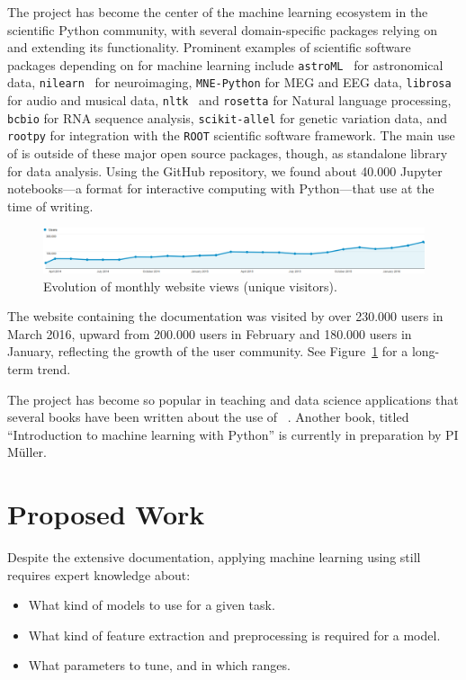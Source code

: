 The \sklearn{} project has become the center of the machine learning ecosystem
in the scientific Python community, with several domain-specific packages
relying on and extending its functionality.
Prominent examples of scientific software packages depending on \sklearn{}
for machine learning include \texttt{astroML}~\autocite{van2013openml} for astronomical
data, \texttt{nilearn}~\autocite{abraham2014machine} for neuroimaging, \texttt{MNE-Python} for MEG
and EEG data, \texttt{librosa}~\autocite{mcfee2015librosa} for audio and musical data,
\texttt{nltk}~\autocite{bird2006nltk} and \texttt{rosetta} for Natural language processing, \texttt{bcbio} for
RNA sequence analysis, \texttt{scikit-allel} for genetic variation data, and \texttt{rootpy} for
integration with the \texttt{ROOT} scientific software framework.
The main use of \sklearn{} is outside of these major open source packages, though,
as standalone library for data analysis. Using the GitHub repository, we found
about 40.000 Jupyter notebooks---a format for interactive computing with
Python---that use \sklearn{} at the time of writing.

\begin{figure}
    \begin{center}
    \includegraphics[width=.95\linewidth]{scikit-learn_site_visits}
    \end{center}
    \caption{Evolution of monthly \sklearn{}  website views (unique visitors).}
    \label{traffic}
\end{figure}

The \sklearn{} website containing the documentation was visited by over
230.000 users in March 2016, upward from 200.000 users in February and 180.000
users in January, reflecting the growth of the \sklearn{} user community. See
Figure~\ref{traffic} for a long-term trend.

The \sklearn{} project has become so popular in teaching and data science
applications that several books have been written about the use of
\sklearn{}~\autocite{garreta2013learning, hackeling2014mastering,
hauck2014scikit, raschka2015python}. Another book, titled ``Introduction to
machine learning with Python'' is currently in preparation by PI M\"uller.

\section{Proposed Work}
Despite the extensive documentation, applying machine learning using \sklearn{}
still requires expert knowledge about:
\begin{itemize}
    \item What kind of models to use for a given task.
    \item What kind of feature extraction and preprocessing is required for a model.
    \item What parameters to tune, and in which ranges.
\end{itemize}

